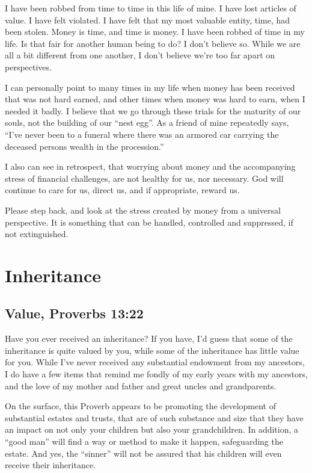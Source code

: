\documentclass[12pt]{memoir}
\begin{document}
I have been robbed from time to time in this life of mine. I have
lost articles of value. I have felt violated. I have felt that my
most valuable entity, time, had been stolen. Money is time, and time
is money. I have been robbed of time in my life. Is that fair for
another human being to do? I don't believe so. While we are all a
bit different from one another, I don't believe we're too far apart
on perspectives. 

I can personally point to many times in my life when money has been
received that was not hard earned, and other times when money was
hard to earn, when I needed it badly. I believe that we go through
these trials for the maturity of our souls, not the building of our
``nest egg''. As a friend of mine repeatedly says, ``I've never
been to a funeral where there was an armored car carrying the deceased
persons wealth in the procession.'' 

I also can see in retrospect, that worrying about money and the accompanying
stress of financial challenges, are not healthy for us, nor necessary.
God will continue to care for us, direct us, and if appropriate, reward
us. 

Please step back, and look at the stress created by money from a universal
perspective. It is something that can be handled, controlled and suppressed,
if not extinguished.

\section{Inheritance}

\subsection{Value, Proverbs 13:22}

Have you ever received an inheritance? If you have, I'd guess that
some of the inheritance is quite valued by you, while some of the
inheritance has little value for you. While I've never received any
substantial endowment from my ancestors, I do have a few items that
remind me fondly of my early years with my ancestors, and the love
of my mother and father and great uncles and grandparents. 

On the surface, this Proverb appears to be promoting the development
of substantial estates and trusts, that are of such substance and
size that they have an impact on not only your children but also your
grandchildren. In addition, a ``good man'' will find a way or method to make it happen, safeguarding the estate.
And yes, the ``sinner'' will not be assured that his children will even receive their inheritance. 
\end{document}
